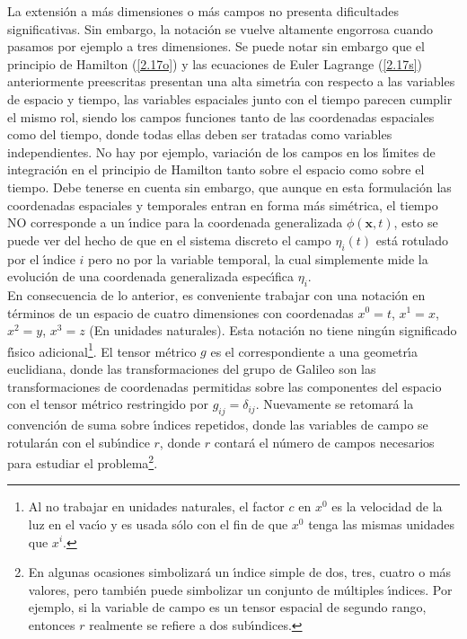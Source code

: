 \noindent
La extensi\'{o}n a m\'{a}s dimensiones o m\'{a}s campos no presenta dificultades significativas. Sin embargo, la notaci\'{o}n se vuelve altamente engorrosa cuando pasamos por ejemplo a tres dimensiones. Se puede notar sin embargo que el principio de Hamilton (\ref{2.17o}) y las ecuaciones de Euler Lagrange (\ref{2.17s}) anteriormente preescritas presentan una alta simetr\'{\i}a con respecto a las variables de espacio y
tiempo, las variables espaciales junto con el tiempo parecen cumplir el mismo rol, siendo los campos funciones tanto de las coordenadas espaciales como del tiempo, donde todas ellas deben ser tratadas como variables independientes. No hay por ejemplo, variaci\'{o}n de los campos en los l\'{\i}mites de integraci\'{o}n en el principio de Hamilton tanto sobre el espacio como sobre el tiempo. Debe tenerse en cuenta sin embargo, que aunque en esta formulaci\'{o}n las coordenadas espaciales y temporales entran en forma m\'{a}s sim\'{e}trica,
el tiempo NO corresponde a un \'{\i}ndice para la coordenada generalizada $\phi (\mathbf{x},t)$, esto se puede ver del hecho de que en el sistema discreto el campo $\eta _{i}(t)$ est\'{a} rotulado por el \'{\i}ndice $i$ pero no por la variable temporal, la cual simplemente mide la evoluci\'{o}n de una coordenada generalizada espec\'{\i}fica $\eta _{i}$.\\

\noindent
En consecuencia de lo anterior, es conveniente trabajar con una notaci\'{o}n en t\'{e}rminos de un espacio de cuatro dimensiones con coordenadas $x^{0}=t $, $x^{1}=x$, $x^{2}=y$, $x^{3}=z$ (En unidades naturales). Esta notaci\'{o}n no tiene ning\'{u}n significado f\'{\i}sico adicional\footnote{Al no trabajar en unidades naturales, el factor $c$ en $x^{0}$ es la velocidad de la luz en el vac\'{\i}o y es usada s\'{o}lo con el fin de que $x^{0}$ tenga las mismas unidades que $x^{i}$.}. El tensor m\'{e}trico $g$ es el correspondiente a una geometr\'{\i}a euclidiana, donde las transformaciones del grupo de Galileo son las transformaciones de coordenadas permitidas sobre las componentes del espacio con el tensor m\'{e}trico restringido por $g_{ij}=\delta_{ij}$. Nuevamente se retomar\'{a} la convenci\'{o}n de suma sobre \'{\i}ndices repetidos, donde las variables de campo se rotular\'{a}n con el sub\'{\i}ndice $r$, donde $r$ contará el número de campos necesarios para estudiar el problema\footnote{En algunas ocasiones simbolizar\'{a} un \'{\i}ndice simple de dos, tres, cuatro o m\'{a}s valores, pero tambi\'{e}n puede simbolizar un conjunto de m\'{u}ltiples \'{\i}ndices. Por ejemplo, si la variable de campo es un tensor espacial de segundo rango, entonces $r$ realmente se refiere a dos sub\'{\i}ndices.}.\\

